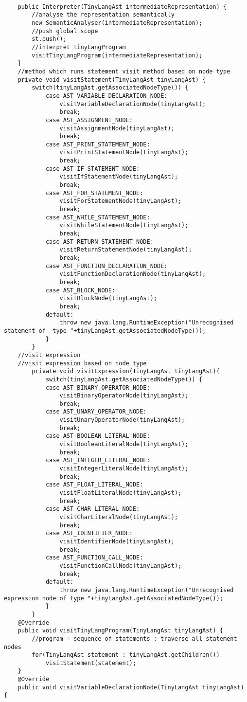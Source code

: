\begin{lstlisting}[basicstyle=\miniscule,caption=Interpreter,label=listing:interpreter]
	
	public Interpreter(TinyLangAst intermediateRepresentation) {
		//analyse the representation semantically
		new SemanticAnalyser(intermediateRepresentation);
		//push global scope 
		st.push();
		//interpret tinyLangProgram
		visitTinyLangProgram(intermediateRepresentation);
	}
	//method which runs statement visit method based on node type
	private void visitStatement(TinyLangAst tinyLangAst) {
		switch(tinyLangAst.getAssociatedNodeType()) {
			case AST_VARIABLE_DECLARATION_NODE:
				visitVariableDeclarationNode(tinyLangAst);
				break;
			case AST_ASSIGNMENT_NODE:
				visitAssignmentNode(tinyLangAst);
				break;
			case AST_PRINT_STATEMENT_NODE:
				visitPrintStatementNode(tinyLangAst);
				break;
			case AST_IF_STATEMENT_NODE:
				visitIfStatementNode(tinyLangAst);
				break;
			case AST_FOR_STATEMENT_NODE:
				visitForStatementNode(tinyLangAst);
				break;
			case AST_WHILE_STATEMENT_NODE:
				visitWhileStatementNode(tinyLangAst);
				break;
			case AST_RETURN_STATEMENT_NODE:
				visitReturnStatementNode(tinyLangAst);
				break;
			case AST_FUNCTION_DECLARATION_NODE:
				visitFunctionDeclarationNode(tinyLangAst);
				break;
			case AST_BLOCK_NODE:
				visitBlockNode(tinyLangAst);
				break;
			default:
				throw new java.lang.RuntimeException("Unrecognised statement of  type "+tinyLangAst.getAssociatedNodeType());
			}	
		}
	//visit expression 
	//visit expression based on node type 
		private void visitExpression(TinyLangAst tinyLangAst){
			switch(tinyLangAst.getAssociatedNodeType()) {
			case AST_BINARY_OPERATOR_NODE:
				visitBinaryOperatorNode(tinyLangAst);
				break;
			case AST_UNARY_OPERATOR_NODE:
				visitUnaryOperatorNode(tinyLangAst);
				break;
			case AST_BOOLEAN_LITERAL_NODE:
				visitBooleanLiteralNode(tinyLangAst);
				break;
			case AST_INTEGER_LITERAL_NODE:
				visitIntegerLiteralNode(tinyLangAst);
				break;
			case AST_FLOAT_LITERAL_NODE:
				visitFloatLiteralNode(tinyLangAst);
				break;
			case AST_CHAR_LITERAL_NODE:
				visitCharLiteralNode(tinyLangAst);
				break;
			case AST_IDENTIFIER_NODE:
				visitIdentifierNode(tinyLangAst);
				break;
			case AST_FUNCTION_CALL_NODE:
				visitFunctionCallNode(tinyLangAst);
				break;
			default:
				throw new java.lang.RuntimeException("Unrecognised expression node of type "+tinyLangAst.getAssociatedNodeType());
			}	
		}
	@Override
	public void visitTinyLangProgram(TinyLangAst tinyLangAst) {
		//program ≡ sequence of statements : traverse all statement nodes
		for(TinyLangAst statement : tinyLangAst.getChildren()) 
			visitStatement(statement);
	}
	@Override
	public void visitVariableDeclarationNode(TinyLangAst tinyLangAst) {	

\end{lstlisting}

